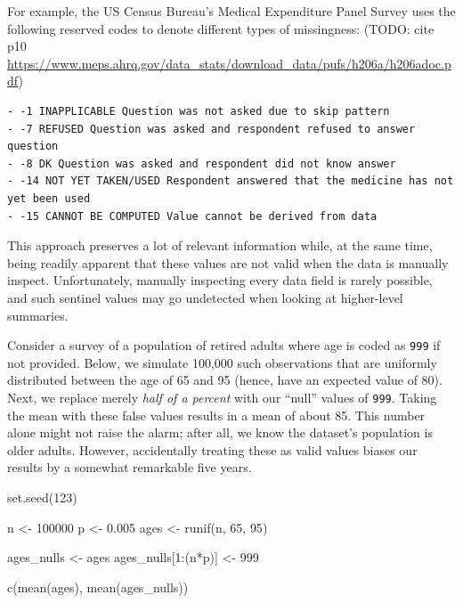 \documentclass[
]{krantz}
\makeatletter
\newenvironment{Shaded}{\begin{snugshade}}{\end{snugshade}}
\newcommand{\DecValTok}[1]{\textcolor[rgb]{0.06,0.06,0.06}{#1}}
\newcommand{\FloatTok}[1]{\textcolor[rgb]{0.06,0.06,0.06}{#1}}
\newcommand{\FunctionTok}[1]{\textcolor[rgb]{0,0,0}{#1}}
\newcommand{\NormalTok}[1]{#1}
\newcommand{\OtherTok}[1]{\textcolor[rgb]{0.37,0.37,0.37}{#1}}
\newcommand{\SpecialCharTok}[1]{\textcolor[rgb]{0,0,0}{#1}}
\newenvironment{kframe}{%
\medskip{}
\setlength{\fboxsep}{.8em}
 \def\at@end@of@kframe{}%
 \ifinner\ifhmode%
  \def\at@end@of@kframe{\end{minipage}}%
  \begin{minipage}{\columnwidth}%
 \fi\fi%
 \def\FrameCommand##1{\hskip\@totalleftmargin \hskip-\fboxsep
 \colorbox{shadecolor}{##1}\hskip-\fboxsep
     \hskip-\linewidth \hskip-\@totalleftmargin \hskip\columnwidth}%
 \MakeFramed {\advance\hsize-\width
   \@totalleftmargin\z@ \linewidth\hsize
   \@setminipage}}%
 {\par\unskip\endMakeFramed%
 \at@end@of@kframe}
\renewenvironment{Shaded}{\begin{kframe}}{\end{kframe}}
\makeatother
\begin{document}
For example, the US Census Bureau's Medical Expenditure Panel Survey uses the following reserved codes to denote different types of missingness: (TODO: cite p10 \url{https://www.meps.ahrq.gov/data_stats/download_data/pufs/h206a/h206adoc.pdf})

\begin{verbatim}
- -1 INAPPLICABLE Question was not asked due to skip pattern
- -7 REFUSED Question was asked and respondent refused to answer question
- -8 DK Question was asked and respondent did not know answer
- -14 NOT YET TAKEN/USED Respondent answered that the medicine has not yet been used
- -15 CANNOT BE COMPUTED Value cannot be derived from data
\end{verbatim}

This approach preserves a lot of relevant information while, at the same time, being readily apparent that these values are not valid when the data is manually inspect. Unfortunately, manually inspecting every data field is rarely possible, and such sentinel values may go undetected when looking at higher-level summaries.

Consider a survey of a population of retired adults where age is coded as \texttt{999} if not provided. Below, we simulate 100,000 such observations that are uniformly distributed between the age of 65 and 95 (hence, have an expected value of 80). Next, we replace merely \emph{half of a percent} with our ``null'' values of \texttt{999}. Taking the mean with these false values results in a mean of about 85. This number alone might not raise the alarm; after all, we know the dataset's population is older adults. However, accidentally treating these as valid values biases our results by a somewhat remarkable five years.

\begin{Shaded}
\begin{Highlighting}[]
\FunctionTok{set.seed}\NormalTok{(}\DecValTok{123}\NormalTok{)}

\NormalTok{n }\OtherTok{\textless{}{-}} \DecValTok{100000}
\NormalTok{p }\OtherTok{\textless{}{-}} \FloatTok{0.005}
\NormalTok{ages }\OtherTok{\textless{}{-}} \FunctionTok{runif}\NormalTok{(n, }\DecValTok{65}\NormalTok{, }\DecValTok{95}\NormalTok{)}

\NormalTok{ages\_nulls }\OtherTok{\textless{}{-}}\NormalTok{ ages}
\NormalTok{ages\_nulls[}\DecValTok{1}\SpecialCharTok{:}\NormalTok{(n}\SpecialCharTok{*}\NormalTok{p)] }\OtherTok{\textless{}{-}} \DecValTok{999}

\FunctionTok{c}\NormalTok{(}\FunctionTok{mean}\NormalTok{(ages), }\FunctionTok{mean}\NormalTok{(ages\_nulls))}
\end{Highlighting}
\end{Shaded}
\end{document}
